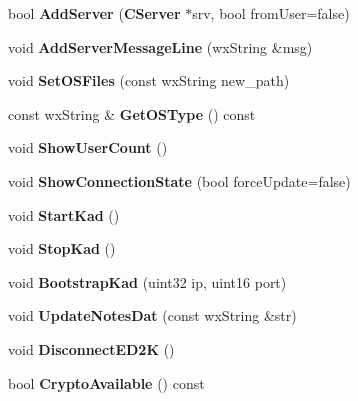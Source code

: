 \begin{DoxyCompactItemize}
\item 
bool {\bfseries AddServer} ({\bf CServer} $\ast$srv, bool fromUser=false)\label{classCamuleApp_a53d0853af9d54c2db15e5907cd10dccd}

\item 
void {\bfseries AddServerMessageLine} (wxString \&msg)\label{classCamuleApp_aa7b6f28c7b9380c9c4e9d92e2c6db332}

\item 
void {\bfseries SetOSFiles} (const wxString new\_\-path)\label{classCamuleApp_abe4572b5e111216a01e4dc0cd1762f47}

\item 
const wxString \& {\bfseries GetOSType} () const \label{classCamuleApp_affcfcf2136d4cb76bce171c797d108a2}

\item 
void {\bfseries ShowUserCount} ()\label{classCamuleApp_a3cec99db2b6a5efcd696431723358984}

\item 
void {\bfseries ShowConnectionState} (bool forceUpdate=false)\label{classCamuleApp_a246a250d75cf2fce6b67133765c4c8ee}

\item 
void {\bfseries StartKad} ()\label{classCamuleApp_a98c31b78d806a65a8638c64b40a92dc6}

\item 
void {\bfseries StopKad} ()\label{classCamuleApp_a38d5f628d5805331c269e9dff48fdfa9}

\item 
void {\bf BootstrapKad} (uint32 ip, uint16 port)
\item 
void {\bf UpdateNotesDat} (const wxString \&str)
\item 
void {\bfseries DisconnectED2K} ()\label{classCamuleApp_af640a1e26f6d752b1b9eed9de36941a3}

\item 
bool {\bfseries CryptoAvailable} () const \label{classCamuleApp_a23ff7817439fcaf56278ac3a3e915344}

\end{DoxyCompactItemize}
